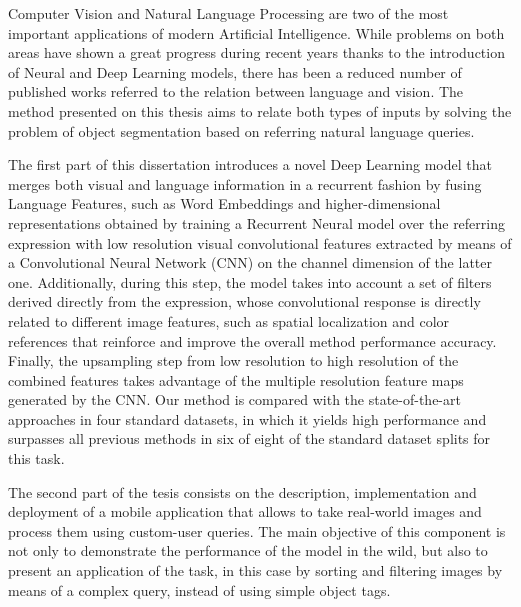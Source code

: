 
Computer Vision and Natural Language Processing are two of the most important applications of modern Artificial Intelligence. While problems on both areas have shown a great progress during recent years thanks to the introduction of Neural and Deep Learning models, there has been a reduced number of published works referred to the relation between language and vision. The method presented on this thesis aims to relate both types of inputs by solving the problem of object segmentation based on referring natural language queries.

The first part of this dissertation introduces a novel Deep Learning model that merges both visual and language information in a recurrent fashion by fusing Language Features, such as Word Embeddings and higher-dimensional representations obtained by training a Recurrent Neural model over the referring expression with low resolution visual convolutional features extracted by means of a Convolutional Neural Network (CNN) on the channel dimension of the latter one. Additionally, during this step, the model takes into account a set of filters derived directly from the expression, whose convolutional response is directly related to different image features, such as spatial localization and color references that reinforce and improve the overall method performance accuracy. Finally, the upsampling step from low resolution to high resolution of the combined features takes advantage of the multiple resolution feature maps generated by the CNN. Our method is compared with the state-of-the-art approaches in four standard datasets, in which it yields high performance and surpasses all previous methods in six of eight of the standard dataset splits for this task.    

The second part of the tesis consists on the description, implementation and deployment of a mobile application that allows to take real-world images and process them using custom-user queries. The main objective of this component is not only to demonstrate the performance of the model in the wild, but also to present an application of the task, in this case by sorting and filtering images by means of a complex query, instead of using simple object tags.  

